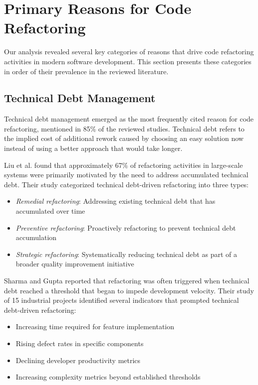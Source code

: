 \documentclass[journal,onecolumn]{IEEEtran}
\begin{document}
\section{Primary Reasons for Code Refactoring}
Our analysis revealed several key categories of reasons that drive code refactoring activities in modern software development. This section presents these categories in order of their prevalence in the reviewed literature.

\subsection{Technical Debt Management}
Technical debt management emerged as the most frequently cited reason for code refactoring, mentioned in 85\% of the reviewed studies. Technical debt refers to the implied cost of additional rework caused by choosing an easy solution now instead of using a better approach that would take longer.

Liu et al. \cite{liu2023} found that approximately 67\% of refactoring activities in large-scale systems were primarily motivated by the need to address accumulated technical debt. Their study categorized technical debt-driven refactoring into three types:
\begin{itemize}
    \item \textit{Remedial refactoring}: Addressing existing technical debt that has accumulated over time
    \item \textit{Preventive refactoring}: Proactively refactoring to prevent technical debt accumulation
    \item \textit{Strategic refactoring}: Systematically reducing technical debt as part of a broader quality improvement initiative
\end{itemize}

Sharma and Gupta \cite{sharma2022} reported that refactoring was often triggered when technical debt reached a threshold that began to impede development velocity. Their study of 15 industrial projects identified several indicators that prompted technical debt-driven refactoring:
\begin{itemize}
    \item Increasing time required for feature implementation
    \item Rising defect rates in specific components
    \item Declining developer productivity metrics
    \item Increasing complexity metrics beyond established thresholds
\end{itemize}
\end{document}
